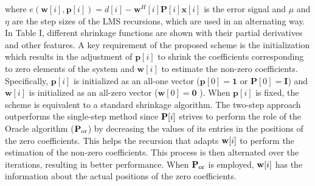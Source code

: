 \documentclass[10pt,onecolumn]{IEEEtran}
\begin{document}
where $e({\boldsymbol w}[i],{\boldsymbol p}[i]) = d[i] -
{\boldsymbol w}^H[i] {\boldsymbol P}[i] {\boldsymbol x}[i]$ is the
error signal and $\mu$ and $\eta$ are the step sizes of the LMS
recursions, which are used in an alternating way. In Table I,
different shrinkage functions are shown with their partial
derivatives and other features. {A key requirement of the proposed
scheme is the initialization which results in the adjustment of
${\boldsymbol p}[i]$ to shrink the coefficients corresponding to
zero elements of the system and ${\boldsymbol w}[i]$ to estimate the
non-zero coefficients. Specifically, ${\boldsymbol p}[i]$ is
initialized as an all-one vector (${\boldsymbol p}[0]= {\boldsymbol
1}$ or ${\boldsymbol P}[0] = {\boldsymbol I}$) and ${\boldsymbol
w}[i]$ is initialized as an all-zero vector (${\boldsymbol w}[0]=
{\boldsymbol 0}$ ). When ${\boldsymbol p}[i]$ is fixed, the scheme
is equivalent to a standard shrinkage algorithm. The two-step
approach outperforms the single-step method since ${\bf P}[i]$
strives to perform the role of the Oracle algorithm (${\bf P}_{\rm
or}$) by decreasing the values of its entries in the positions of
the zero coefficients. This helps the recursion that adapts ${\bf
w}[i]$ to perform the estimation of the non-zero coefficients. This
process is then alternated over the iterations, resulting in better
performance. When ${\bf P}_{\rm or}$ is employed, ${\bf w}[i]$ has
the information about the actual positions of the zero coefficients.
}
\end{document}
